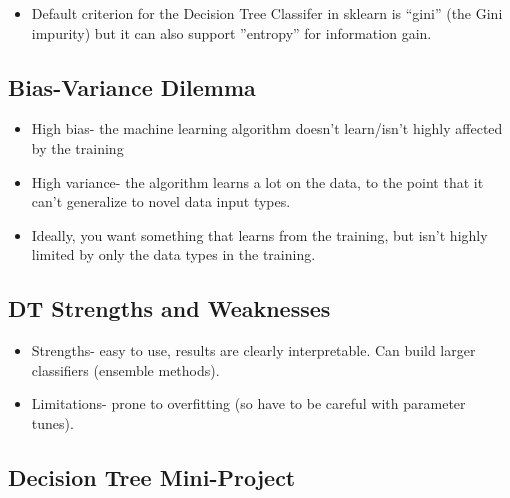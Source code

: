\documentclass[12pt]{report}
\begin{document}
\begin{itemize}

\item Default criterion for the Decision Tree Classifer in sklearn is ``gini'' (the Gini impurity) but it can also support ''entropy'' for information gain. 

\end{itemize}

\subsection{Bias-Variance Dilemma}

\begin{itemize}

\item High bias- the machine learning algorithm doesn't learn/isn't highly affected by the training

\item High variance- the algorithm learns a lot on the data, to the point that it can't generalize to novel data input types. 

\item Ideally, you want something that learns from the training, but isn't highly limited by only the data types in the training. 

\end{itemize}

\subsection{DT Strengths and Weaknesses}

\begin{itemize}

\item Strengths- easy to use, results are clearly interpretable. Can build larger classifiers (ensemble methods). 

\item Limitations- prone to overfitting (so have to be careful with parameter tunes).   

\end{itemize}

\subsection{Decision Tree Mini-Project}
\end{document}
